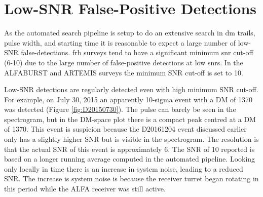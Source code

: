 \documentclass[a4paper,fleqn,usenatbib]{mnras}
\begin{document}
\section{Low-SNR False-Positive Detections}
\label{sec:low_snr}

As the automated search pipeline is setup to do an extensive search in \gls{dm}
trails, pulse width, and starting time it is reasonable to expect a large number
of low-SNR false-detections.  \gls{frb} surveys tend to have a significant
minimum \gls{snr} cut-off (6-10) due to the large number of false-positive
detections at low \glspl{snr}.  In the ALFABURST and ARTEMIS
\citep{2015MNRAS.452.1254K} surveys the minimum SNR cut-off is set to 10.

Low-SNR detections are regularly detected even with high minimum SNR cut-off.
For example, on July 30, 2015 an apparently 10-sigma event with a DM of 1370 was
detected (Figure \ref{fig:D20150730}). The pulse can barely be seen in the
spectrogram, but in the DM-space plot there is a compact peak centred at a DM of
1370. This event is suspicion because the D20161204 event discussed earlier only
has a slightly higher SNR but is visible in the spectrogram. The resolution is
that the actual SNR of this event is approximately 6. The SNR of 10 reported is
based on a longer running average computed in the automated pipeline. Looking
only locally in time there is an increase in system noise, leading to a reduced
SNR. The increase is system noise is because the receiver turret began rotating
in this period while the ALFA receiver was still active.
\end{document}
